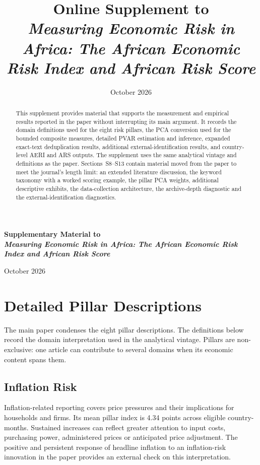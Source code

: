 \documentclass[11pt]{article}
\title{Online Supplement to\\[4pt]\textit{Measuring Economic Risk in Africa: The African Economic Risk Index and African Risk Score}}
\author{}
\date{October 2026}
\begin{document}
\renewcommand{\thetable}{S\arabic{table}}
\renewcommand{\thefigure}{S\arabic{figure}}
\renewcommand{\theequation}{S\arabic{equation}}
\renewcommand{\thesection}{S\arabic{section}}
\begin{center}
{\Large\bfseries Supplementary Material to\\[4pt]\textit{Measuring Economic Risk in Africa: The African Economic Risk Index and African Risk Score}\par}
\vspace{.35cm}October 2026
\end{center}
\begin{abstract}\singlespacing
This supplement provides material that supports the measurement and empirical results reported in the paper without interrupting its main argument. It records the domain definitions used for the eight risk pillars, the PCA conversion used for the bounded composite measures, detailed PVAR estimation and inference, expanded exact-text deduplication results, additional external-identification results, and country-level AERI and ARS outputs. The supplement uses the same analytical vintage and definitions as the paper. Sections~S8--S13 contain material moved from the paper to meet the journal's length limit: an extended literature discussion, the keyword taxonomy with a worked scoring example, the pillar PCA weights, additional descriptive exhibits, the data-collection architecture, the archive-depth diagnostic and the external-identification diagnostics.
\end{abstract}
\tableofcontents
\clearpage

\section{Detailed Pillar Descriptions}
The main paper condenses the eight pillar descriptions. The definitions below record the domain interpretation used in the analytical vintage. Pillars are non-exclusive: one article can contribute to several domains when its economic content spans them.

\subsection{Inflation Risk}
Inflation-related reporting covers price pressures and their implications for households and firms. Its mean pillar index is 4.34 points across eligible country-months. Sustained increases can reflect greater attention to input costs, purchasing power, administered prices or anticipated price adjustment. The positive and persistent response of headline inflation to an inflation-risk innovation in the paper provides an external check on this interpretation.
\end{document}
